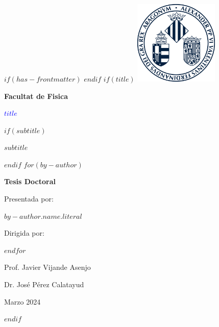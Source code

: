 $if(has-frontmatter)$
\frontmatter
$endif$
$if(title)$
\thispagestyle{empty}
\centering
\vspace*{-3cm} %
\includegraphics[width=0.3\textwidth]{escudouv} %


{\Large\bfseries Facultat de Fisica \par}

\vspace*{1cm}
{\textcolor{blue}{\Huge\bfseries $title$} \par}

\vspace*{5mm}
$if(subtitle)$
\vspace{3ex}
{\Large\bfseries $subtitle$ \par}
$endif$
\vspace{3ex}
$for(by-author)$
{\Large\bfseries Tesis Doctoral \par}
{\large Presentada por: \par}
{\large $by-author.name.literal$ \par}
{\large Dirigida por: \par}
\vspace{5ex}
$endfor$%
\begin{minipage}[t]{0.4\textwidth}
    \centering
    {\large Prof. Javier Vijande Asenjo \par}
\end{minipage}
\hfill
\begin{minipage}[t]{0.4\textwidth}
    \centering
    {\large Dr. José Pérez Calatayud \par}
\end{minipage}


\vspace*{2cm}
{\large Marzo 2024 \par}
\vfill %
\raggedright
$endif$


\newpage
\thispagestyle{empty}
\begin{flushright}
\end{flushright}

